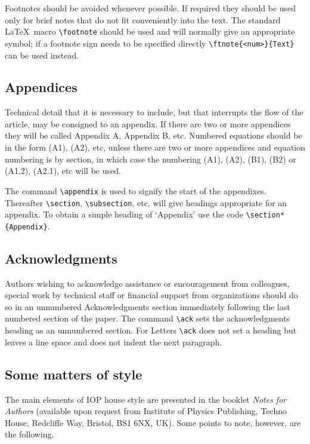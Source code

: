 Footnotes should be avoided whenever possible. If required they should be
used only for brief notes that do not fit conveniently into the text. The
standard \LaTeX\ macro \verb"\footnote" should be used and will normally
give an appropriate symbol; if a footnote sign needs to be specified
directly \verb"\ftnote{<num>}{Text}" can be used instead.


\subsection{Appendices}
Technical detail that it is necessary to include, but that interrupts
the flow of the article, may be consigned to an appendix. If there are
two or more appendices they will be called Appendix A, Appendix B, etc.
Numbered equations should be in the form (A1), (A2), etc,
unless there are two or more appendices and
equation numbering is by section, in which case the numbering (A1),
(A2), (B1), (B2) or
(A1.2), (A2.1), etc will be used.

The command \verb"\appendix" is used to signify the start of the
appendixes. Thereafter \verb"\section", \verb"\subsection", etc, will
give headings appropriate for an appendix. To obtain a simple heading of
`Appendix' use the code \verb"\section*{Appendix}".


\subsection{Acknowledgments}
Authors wishing to acknowledge assistance or encouragement from
colleagues, special work by technical staff or financial support from
organizations should do so in an unnumbered Acknowledgments section
immediately following the last numbered section of the paper. The
command \verb"\ack" sets the acknowledgments heading as an unnumbered
section. For Letters
\verb"\ack" does not set a heading but leaves a line space and does not
indent the next paragraph.


\subsection{Some matters of style}
The main elements of IOP house style are presented in the booklet
{\it Notes for Authors} (available upon request from Institute of Physics
Publishing,
Techno House, Redcliffe Way, Bristol, BS1 6NX, UK). Some points to note,
however, are the following.

